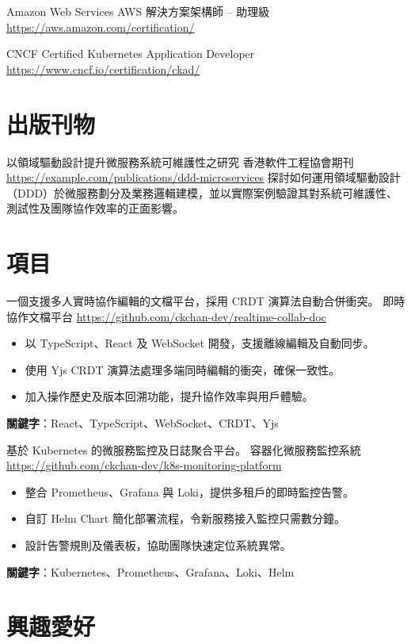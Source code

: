 \documentclass[a4paper, serif, 10pt]{moderncv}
\begin{document}
        {Amazon Web Services}
        {AWS 解決方案架構師 – 助理級}
        {\url{https://aws.amazon.com/certification/}}
        {}
        {}

        {CNCF}
        {Certified Kubernetes Application Developer}
        {\url{https://www.cncf.io/certification/ckad/}}
        {}
        {}
\section{出版刊物}

        {以領域驅動設計提升微服務系統可維護性之研究}
        {香港軟件工程協會期刊}
        {\url{https://example.com/publications/ddd-microservices}}
        {}
        {探討如何運用領域驅動設計（DDD）於微服務劃分及業務邏輯建模，並以實際案例驗證其對系統可維護性、測試性及團隊協作效率的正面影響。}
\section{項目}

        {一個支援多人實時協作編輯的文檔平台，採用 CRDT 演算法自動合併衝突。}
        {即時協作文檔平台}
        {\url{https://github.com/ckchan-dev/realtime-collab-doc}}
        {}
        {\begin{itemize}
\item 以 TypeScript、React 及 WebSocket 開發，支援離線編輯及自動同步。
\item 使用 Yjs CRDT 演算法處理多端同時編輯的衝突，確保一致性。
\item 加入操作歷史及版本回溯功能，提升協作效率與用戶體驗。
\end{itemize}
\textbf{關鍵字}：React、TypeScript、WebSocket、CRDT、Yjs}

        {基於 Kubernetes 的微服務監控及日誌聚合平台。}
        {容器化微服務監控系統}
        {\url{https://github.com/ckchan-dev/k8s-monitoring-platform}}
        {}
        {\begin{itemize}
\item 整合 Prometheus、Grafana 與 Loki，提供多租戶的即時監控告警。
\item 自訂 Helm Chart 簡化部署流程，令新服務接入監控只需數分鐘。
\item 設計告警規則及儀表板，協助團隊快速定位系統異常。
\end{itemize}
\textbf{關鍵字}：Kubernetes、Prometheus、Grafana、Loki、Helm}
\section{興趣愛好}
\end{document}
